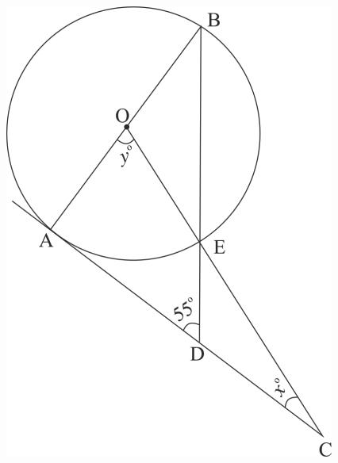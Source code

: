 \begin{enumerate}
\begin{figure}[!ht]
		\centering
		\includegraphics[width=\columnwidth]{figs/icse3.jpg}
		\caption{}
		\label{fig:enter-label}
	\end{figure}


\end{enumerate}
